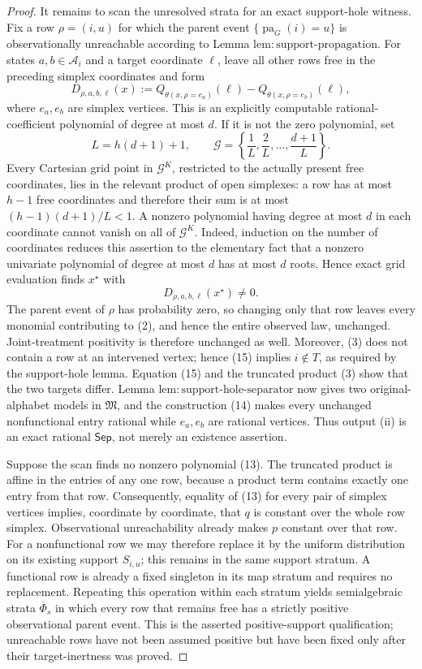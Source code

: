 \documentclass{article}
\begin{document}
\begin{proof}
It remains to scan the unresolved strata for an exact support-hole witness. Fix a row \(\rho=(i,u)\) for which the parent event \(\{\operatorname{pa}_G(i)=u\}\) is observationally unreachable according to Lemma \(\mathrm{lem:support\text{-}propagation}\). For states \(a,b\in\mathcal A_i\) and a target coordinate \(\ell\), leave all other rows free in the preceding simplex coordinates and form
\[
 D_{\rho,a,b,\ell}(x)
 :=Q_{\theta(x,\rho=e_a)}(\ell)
   -Q_{\theta(x,\rho=e_b)}(\ell),
 \tag{13}
\]
where \(e_a,e_b\) are simplex vertices. This is an explicitly computable rational-coefficient polynomial of degree at most \(d\). If it is not the zero polynomial, set
\[
 L=h(d+1)+1,
 \qquad
 \mathcal G=\left\{\frac1L,\frac2L,\ldots,\frac{d+1}{L}\right\}.
 \tag{14}
\]
Every Cartesian grid point in \(\mathcal G^K\), restricted to the actually present free coordinates, lies in the relevant product of open simplexes: a row has at most \(h-1\) free coordinates and therefore their sum is at most \((h-1)(d+1)/L<1\). A nonzero polynomial having degree at most \(d\) in each coordinate cannot vanish on all of \(\mathcal G^K\). Indeed, induction on the number of coordinates reduces this assertion to the elementary fact that a nonzero univariate polynomial of degree at most \(d\) has at most \(d\) roots. Hence exact grid evaluation finds \(x^\star\) with
\[
 D_{\rho,a,b,\ell}(x^\star)\ne0.
 \tag{15}
\]
The parent event of \(\rho\) has probability zero, so changing only that row leaves every monomial contributing to (2), and hence the entire observed law, unchanged. Joint-treatment positivity is therefore unchanged as well. Moreover, (3) does not contain a row at an intervened vertex; hence (15) implies \(i\notin T\), as required by the support-hole lemma. Equation (15) and the truncated product (3) show that the two targets differ. Lemma \(\mathrm{lem:support\text{-}hole\text{-}separator}\) now gives two original-alphabet models in \(\mathfrak M\), and the construction (14) makes every unchanged nonfunctional entry rational while \(e_a,e_b\) are rational vertices. Thus output (ii) is an exact rational \(\mathsf{Sep}\), not merely an existence assertion.

Suppose the scan finds no nonzero polynomial (13). The truncated product is affine in the entries of any one row, because a product term contains exactly one entry from that row. Consequently, equality of (13) for every pair of simplex vertices implies, coordinate by coordinate, that \(q\) is constant over the whole row simplex. Observational unreachability already makes \(p\) constant over that row. For a nonfunctional row we may therefore replace it by the uniform distribution on its existing support \(S_{i,u}\); this remains in the same support stratum. A functional row is already a fixed singleton in its map stratum and requires no replacement. Repeating this operation within each stratum yields semialgebraic strata \(\overline\Phi_s\) in which every row that remains free has a strictly positive observational parent event. This is the asserted positive-support qualification; unreachable rows have not been assumed positive but have been fixed only after their target-inertness was proved.


\end{proof}
\end{document}
